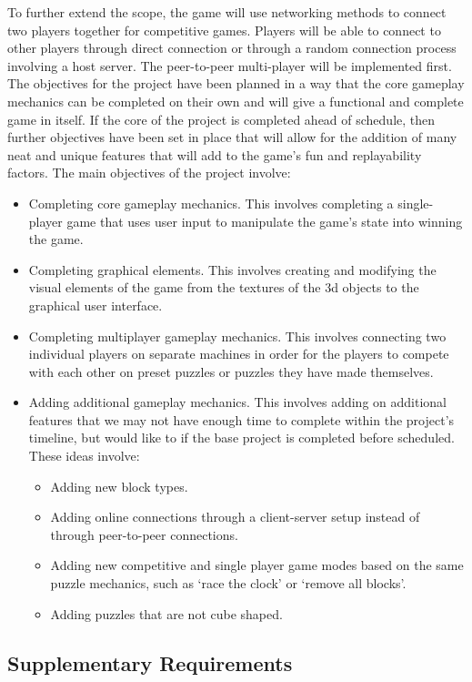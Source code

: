 \documentclass[12pt]{article}
\begin{document}
To further extend the scope, the game will use networking methods to connect two players together for competitive games. Players will be able to connect to other players through direct connection or through a random connection process involving a host server. The peer-to-peer multi-player will be implemented first.
The objectives for the project have been planned in a way that the core gameplay mechanics can be completed on their own and will give a functional and complete game in itself.
If the core of the project is completed ahead of schedule, then further objectives have been set in place that will allow for the addition of many neat and unique features that will add to the game's fun and replayability factors. The main objectives of the project involve:
\begin{itemize}
 \item Completing core gameplay mechanics. This involves completing a single-player game that uses user input to manipulate the game's state into winning the game.
 \item Completing graphical elements. This involves creating and modifying the visual elements of the game from the textures of the 3d objects to the graphical user interface.
 \item Completing multiplayer gameplay mechanics. This involves connecting two individual players on separate machines in order for the players to compete with each other on preset puzzles or puzzles they have made themselves.
 \item Adding additional gameplay mechanics. This involves adding on additional features that we may not have enough time to complete within the project's timeline, but would like to if the base project is completed before scheduled. These ideas involve:
  \begin{itemize}
  \item Adding new block types.
  \item Adding online connections through a client-server setup instead of through peer-to-peer connections.
  \item Adding new competitive and single player game modes based on the same puzzle mechanics, such as ‘race the clock’ or ‘remove all blocks’.
  \item Adding puzzles that are not cube shaped.
  \end{itemize}
\end{itemize}
\subsection{Supplementary Requirements}\label{supplementary-reqs-SM}
\end{document}
